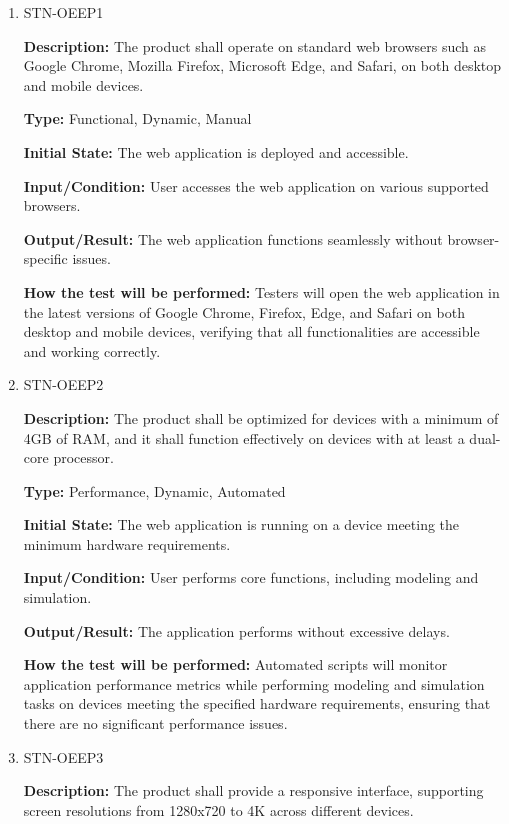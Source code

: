 \documentclass[12pt, titlepage]{article}
\begin{document}
\begin{enumerate}

\item{STN-OEEP1\\}

\textbf{Description:} The product shall operate on standard web browsers such as Google Chrome, Mozilla Firefox, Microsoft Edge, and Safari, on both desktop and mobile devices.

\textbf{Type:} Functional, Dynamic, Manual

\textbf{Initial State:} The web application is deployed and accessible.

\textbf{Input/Condition:} User accesses the web application on various supported browsers.

\textbf{Output/Result:} The web application functions seamlessly without browser-specific issues.

\textbf{How the test will be performed:} Testers will open the web application in the latest versions of Google Chrome, Firefox, Edge, and Safari on both desktop and mobile devices, verifying that all functionalities are accessible and working correctly.

\item{STN-OEEP2\\}

\textbf{Description:} The product shall be optimized for devices with a minimum of 4GB of RAM, and it shall function effectively on devices with at least a dual-core processor.

\textbf{Type:} Performance, Dynamic, Automated

\textbf{Initial State:} The web application is running on a device meeting the minimum hardware requirements.

\textbf{Input/Condition:} User performs core functions, including modeling and simulation.

\textbf{Output/Result:} The application performs without excessive delays.

\textbf{How the test will be performed:} Automated scripts will monitor application performance metrics while performing modeling and simulation tasks on devices meeting the specified hardware requirements, ensuring that there are no significant performance issues.

\item{STN-OEEP3\\}

\textbf{Description:} The product shall provide a responsive interface, supporting screen resolutions from 1280x720 to 4K across different devices.


\end{enumerate}
\end{document}
